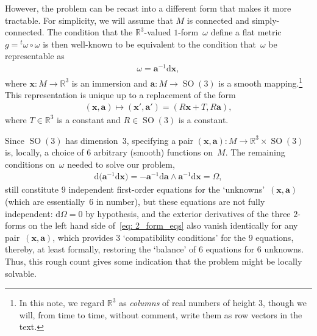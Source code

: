 \documentclass[11pt]{article}
\numberwithin{equation}{section}
\renewcommand{\d}{\mathrm{d}}%
\newcommand{\SO}{\operatorname{SO}}
\newcommand{\mba}{\mathbf{a}}
\newcommand{\mbx}{\mathbf{x}}
\begin{document}
However, the problem can be recast into a different form that makes it more tractable. For simplicity, we will assume that $M$ is connected and simply-connected. The condition that the $\mathbb{R}^3$-valued $1$-form~$\omega$ define a flat metric $g = {}^t\omega \circ \omega$ is then well-known to be equivalent to the condition that~$\omega$
be representable as
\begin{gather*}
\omega = \mba^{-1} \d \mbx,
\end{gather*}
where $\mbx\colon M\to\mathbb{R}^3$ is an immersion and $\mba\colon M\to\SO(3)$ is a smooth mapping.\footnote{In this note, we regard $\mathbb{R}^3$ as \emph{columns}
of real numbers of height $3$, though we will, from time to time, without comment, write them as row vectors in the text.}
This representation is unique up to a replacement of the form
\begin{gather*}
(\mbx,\mba)\mapsto (\mbx',\mba') = (R\mbx + T, R\mba),
\end{gather*}
where $T\in\mathbb{R}^3$ is a constant and $R\in\SO(3)$ is a constant.

Since $\SO(3)$ has dimension~$3$, specifying a pair $(\mbx,\mba)\colon M\to\mathbb{R}^3\times\SO(3)$ is, locally, a choice of $6$ arbitrary (smooth) functions on~$M$.
The remaining conditions on~$\omega$ needed to solve our problem,
\begin{gather}\label{eq: 2_form_eqs}
\d\big(\mba^{-1} \d \mbx\big) = -\mba^{-1} \d \mba \wedge \mba^{-1} \d \mbx = \Omega,
\end{gather}
still constitute $9$ independent first-order equations
for the `unknowns'~$(\mbx,\mba)$ (which are essentially~$6$ in number),
but these equations are not fully independent:
 $\d\Omega=0$ by hypothesis,
and the exterior derivatives of the three $2$-forms
on the left hand side of~\eqref{eq: 2_form_eqs}
also vanish identically for any pair~$(\mbx,\mba)$,
which provides $3$ `compatibility conditions' for the $9$ equations,
thereby, at least formally,
restoring the `balance' of $6$ equations for $6$ unknowns.
Thus, this rough count gives some indication that the problem might
be locally solvable.
\end{document}
